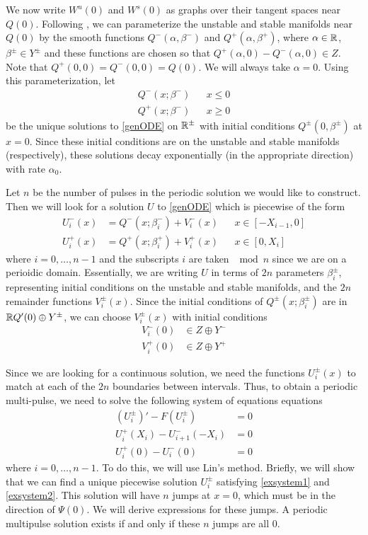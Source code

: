 \documentclass[thesis.tex]{subfiles}
\begin{document}
We now write $W^u(0)$ and $W^s(0)$ as graphs over their tangent spaces near $Q(0)$. Following \cite{Sandstede1997}, we can parameterize the unstable and stable manifolds near $Q(0)$ by the smooth functions $Q^-(\alpha, \beta^-)$ and $Q^+(\alpha, \beta^+)$, where $\alpha \in {\mathbb R}$, $\beta^\pm \in Y^\pm$ and these functions are chosen so that $Q^+(\alpha, 0) - Q^-(\alpha, 0) \in Z$. Note that $Q^+(0, 0) = Q^-(0, 0) = Q(0)$. We will always take $\alpha = 0$. Using this parameterization, let
\begin{align*}
Q^-(x; \beta^-) && x \leq 0 \\
Q^+(x; \beta^-) && x \geq 0
\end{align*}
be the unique solutions to \eqref{genODE} on ${\mathbb R}^\pm$ with initial conditions $Q^\pm(0, \beta^\pm)$ at $x = 0$. Since these initial conditions are on the unstable and stable manifolds (respectively), these solutions decay exponentially (in the appropriate direction) with rate $\alpha_0$.

Let $n$ be the number of pulses in the periodic solution we would like to construct. Then we will look for a solution $U$ to \eqref{genODE} which is piecewise of the form
\begin{equation}\label{Upiecewise}
\begin{aligned}
U_i^-(x) &= Q^-(x; \beta_i^-) + V_i^-(x) && x \in [-X_{i-1}, 0] \\
U_i^+(x) &= Q^+(x; \beta_i^+) + V_i^+(x) && x \in [0, X_i]
\end{aligned}
\end{equation}
where $i = 0, \dots, n-1$ and the subscripts $i$ are taken $\mod n$ since we are on a perioidic domain. Essentially, we are writing $U$ in terms of $2n$ parameters $\beta_i^\pm$, representing initial conditions on the unstable and stable manifolds, and the $2n$ remainder functions $V_i^\pm(x)$. Since the initial conditions of $Q^\pm(x; \beta_i^\pm)$ are in ${\mathbb R} Q'(0) \oplus Y^\pm$, we can choose $V_i^\pm(x)$ with initial conditions
\begin{align*}
V_i^-(0) &\in Z \oplus Y^- \\
V_i^+(0) &\in Z \oplus Y^+
\end{align*}

Since we are looking for a continuous solution, we need the functions $U_i^\pm(x)$ to match at each of the $2n$ boundaries between intervals. Thus, to obtain a periodic multi-pulse, we need to solve the following system of equations equations
\begin{align}
(U_i^\pm)' - F(U_i^\pm) &= 0 \label{exsystem1} \\
U_i^+(X_i) - U_{i+1}^-(-X_i) &= 0 \label{exsystem2} \\
U_i^+(0) - U_i^-(0) &= 0 \label{exsystem3}
\end{align}
where $i = 0, \dots, n-1$. To do this, we will use Lin's method. Briefly, we will show that we can find a unique piecewise solution $U_i^\pm$ satisfying \eqref{exsystem1} and \eqref{exsystem2}. This solution will have $n$ jumps at $x = 0$, which must be in the direction of $\Psi(0)$. We will derive expressions for these jumps. A periodic multipulse solution exists if and only if these $n$ jumps are all 0.
\end{document}
